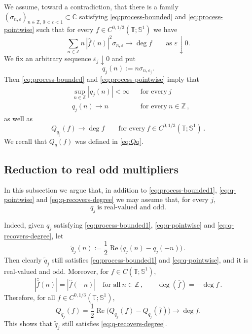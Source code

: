 \documentclass[11pt]{amsart}
\theoremstyle{definition}
\theoremstyle{remark}
\newcommand{\T}{\mathbb T}
\newcommand{\Sone}{\mathbb S^1}
\newcommand{\Z}{\mathbb Z}
\newcommand{\C}{\mathbb C}
\newcommand{\wh}{\widehat}
\DeclareMathOperator{\degmap}{deg}
\begin{document}
We assume, toward a contradiction, that there is a family $(\sigma_{n,\varepsilon})_{n\in\Z,\,0<\varepsilon<1}\subset\C$ satisfying \eqref{eq:process-bounded} and \eqref{eq:process-pointwise} such that for every $f\in C^{0,1/3}(\T;\Sone)$ we have
\[
 \sum_{n\in\Z}n\,|\wh f(n)|^2\sigma_{n,\varepsilon}
 \longrightarrow \degmap f
 \qquad\text{as }\varepsilon\downarrow0.
\]
We fix an arbitrary sequence $\varepsilon_j\downarrow0$ and put
\[
 q_j(n):=n\sigma_{n,\varepsilon_j}.
\]
Then \eqref{eq:process-bounded} and \eqref{eq:process-pointwise} imply that
\begin{align}
    \label{eq:process-bounded1}
    & \sup_{n\in\Z} |q_j(n)| < \infty
    && \text{for every}\ j \\
    \label{eq:q-pointwise}
    & q_j(n)\longrightarrow n
    && \text{for every}\ n\in\Z \,,
\end{align}
as well as
\begin{equation}\label{eq:q-recovers-degree}
 Q_{q_j}(f)\longrightarrow\degmap f
 \qquad\text{for every}\ f\in C^{0,1/3}(\T;\Sone) \,.
\end{equation}
We recall that $Q_q(f)$ was defined in \eqref{eq:Qq}.


\subsection{Reduction to real odd multipliers}

In this subsection we argue that, in addition to \eqref{eq:process-bounded1}, \eqref{eq:q-pointwise} and \eqref{eq:q-recovers-degree} we may assume that, for every $j$,
\begin{equation}\label{eq:q-odd}
    q_j \ \text{is real-valued and odd.}
\end{equation}

Indeed, given $q_j$ satisfying \eqref{eq:process-bounded1}, \eqref{eq:q-pointwise} and \eqref{eq:q-recovers-degree}, let
\begin{equation}\label{eq:odd-part}
 \widetilde q_j(n)
 :=\frac12\operatorname{Re}\big(q_j(n)-q_j(-n)\big) \,.
\end{equation}
Then clearly $\widetilde q_j$ still satisfies \eqref{eq:process-bounded1} and \eqref{eq:q-pointwise}, and it is real-valued and odd. Moreover, for $f\in C(\T;\Sone)$,
\[
 |\wh{\overline f}(n)| = |\wh f(-n)|
 \quad\text{for all}\ n\in\Z \,,
 \qquad
 \degmap(\overline f)=-\degmap f \,.
\]
Therefore, for all $f\in C^{0,1/3}(\T;\Sone)$,
\[
 Q_{\widetilde q_j}(f)
 =\frac12\operatorname{Re}
 \big(Q_{q_j}(f)-Q_{q_j}(\overline f)\big)
 \longrightarrow\degmap f.
\]
This shows that $\widetilde q_j$ still satisfies \eqref{eq:q-recovers-degree}.
\end{document}
